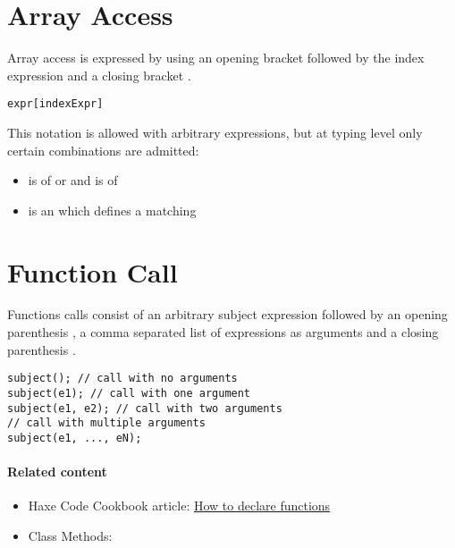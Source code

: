 \section{Array Access}
\label{expression-array-access}

Array access is expressed by using an opening bracket \expr{[} followed by the index expression and a closing bracket \expr{]}.

\begin{lstlisting}
expr[indexExpr]
\end{lstlisting}

This notation is allowed with arbitrary expressions, but at typing level only certain combinations are admitted:

\begin{itemize}
	\item {} is of  or  and  is of 
	\item {} is an  which defines a matching 
\end{itemize}


\section{Function Call}
\label{expression-function-call}

Functions calls consist of an arbitrary subject expression followed by an opening parenthesis \expr{(}, a comma \expr{,} separated list of expressions as arguments and a closing parenthesis \expr{)}.

\begin{lstlisting}
subject(); // call with no arguments
subject(e1); // call with one argument
subject(e1, e2); // call with two arguments
// call with multiple arguments
subject(e1, ..., eN);
\end{lstlisting}


\paragraph{Related content}
\begin{itemize}
	\item Haxe Code Cookbook article: \href{http://code.haxe.org/category/beginner/declare-functions.html}{How to declare functions}
	\item Class Methods: 
\end{itemize}


